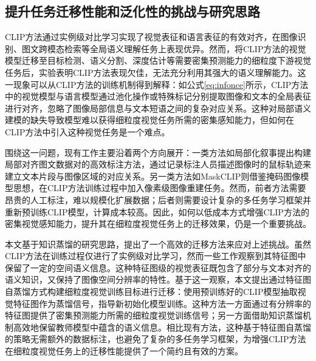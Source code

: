 
\subsection{提升任务迁移性能和泛化性的挑战与研究思路}

CLIP方法通过实例级对比学习实现了视觉表征和语言表征的有效对齐，在图像识别、图文跨模态检索等全局语义理解任务上表现优异。然而，将CLIP方法的视觉模型迁移至目标检测、语义分割、深度估计等需要密集预测能力的细粒度下游视觉任务后，实验表明CLIP方法表现欠佳，无法充分利用其强大的语义理解能力。这一现象可以从CLIP方法的训练机制得到解释：如公式\eqref{eq:infonce}所示，CLIP方法中的视觉模型与语言模型通过池化操作或特殊标记分别提取图像和文本的全局表征进行对齐，忽略了图像局部信息与文本短语之间的复杂对应关系。这种对局部语义建模的缺失导致模型难以获得细粒度视觉任务所需的密集感知能力，但如何在CLIP方法中引入这种视觉任务是一个难点。

围绕这一问题，现有工作主要沿着两个方向展开：一类方法如局部化叙事\cite{LocNar}提出构建局部对齐图文数据对的高效标注方法，通过记录标注人员描述图像时的鼠标轨迹来建立文本片段与图像区域的对应关系。另一类方法如MaskCLIP\cite{MaskCLIP}则借鉴掩码图像模型\cite{he2022masked}思想，在CLIP方法训练过程中加入像素级图像重建任务。然而，前者方法需要昂贵的人工标注，难以规模化扩展数据；后者则需要设计复杂的多任务学习框架并重新预训练CLIP模型，计算成本较高。因此，如何以低成本方式增强CLIP方法的密集视觉感知能力，提升其在细粒度视觉任务上的迁移效果，仍是一个重要挑战。

本文基于知识蒸馏\cite{hinton2015knowledge}的研究思路，提出了一个高效的迁移方法来应对上述挑战。虽然CLIP方法在训练过程仅进行了实例级对比学习，然而一些工作观察到其特征图中保留了一定的空间语义信息\cite{clipseg}。这种特征图级的视觉表征既包含了部分与文本对齐的语义知识，又保持了图像空间分辨率的特性。基于这一观察，本文提出通过特征图自蒸馏方式构建细粒度视觉训练目标进行迁移：使用预训练好的CLIP模型抽取视觉特征图作为蒸馏信号，指导新初始化模型训练。这种方法一方面通过有分辨率的特征图提供了密集预测能力所需的细粒度视觉训练信号；另一方面借助知识蒸馏机制高效地保留教师模型中蕴含的语义信息。相比现有方法，这种基于特征图自蒸馏的策略无需额外的数据标注，也避免了复杂的多任务学习框架，为增强CLIP方法在细粒度视觉任务上的迁移性能提供了一个简约且有效的方案。

